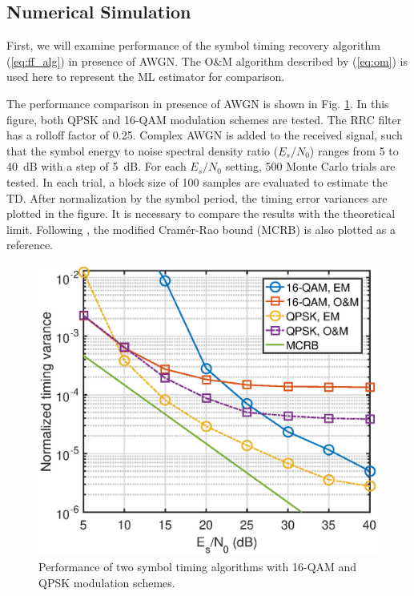 \documentclass[journal,comsoc,onecolumn, 12pt,draftclsnofoot]{IEEEtran}
\begin{document}
\subsection{Numerical Simulation}
\label{sec:per_sim}
First, we will examine performance of the symbol timing recovery algorithm (\ref{eq:ff_alg}) in presence of AWGN.
The O\&M algorithm
described by (\ref{eq:om})
is used here to represent the ML estimator for comparison.

The performance comparison in presence of AWGN is shown in Fig. \ref{fig:timing_per}.
In this figure, both QPSK and 16-QAM modulation schemes are tested.
The RRC filter has a rolloff factor of 0.25. 
Complex AWGN is added to the received signal, such that the symbol energy to noise spectral density ratio (\(E_s/N_0\)) ranges from 5 to 40~dB with a step of 5~dB.
For each \(E_s/N_0\) setting, 500 Monte Carlo trials are tested.
In each trial, a block size of 100 samples are evaluated to estimate the TD.
After normalization by the symbol period, the timing error variances are plotted in the figure.
It is necessary to compare the results with the theoretical limit.
Following \cite{mengali1997synchronization}, the modified Cram\'er-Rao bound (MCRB) is also plotted as a reference.

\begin{figure}[ht]
\centering
\includegraphics[width=3 in]{pic/per_timing.eps}
\caption{Performance of two symbol timing algorithms with 16-QAM and QPSK modulation schemes.}
\label{fig:timing_per} 
\end{figure}   
\end{document}

